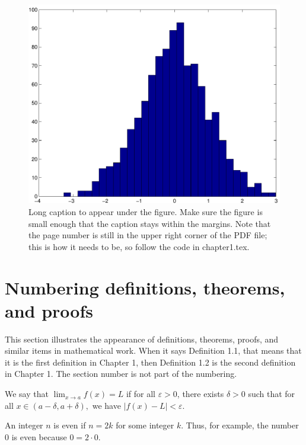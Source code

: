 \begin{landscape}
\thispagestyle{lscape}
\pagestyle{lscape}
  \begin{figure}
    \includegraphics[width=\linewidth,height=\textheight-1in]{figures/figure.pdf}
    \caption[Short caption for List of Figures]{Long caption to appear under the figure.  Make sure the figure is small enough that the caption stays within the margins.  Note that the page number is still in the upper right corner of the PDF file; this is how it needs to be, so follow the code in chapter1.tex.}
  \end{figure}
\end{landscape}

\section{Numbering definitions, theorems, and proofs}
This section illustrates the appearance of definitions, theorems, proofs, and similar items in mathematical work.
When it says Definition 1.1, that means that it is the first definition in Chapter 1, then Definition 1.2 is the second definition in Chapter 1.
The section number is not part of the numbering.

\begin{definition}
We say that $\lim_{x \to a} f(x) = L$ if for all $\varepsilon > 0$, there exists $\delta > 0$ such that for all $x \in (a-\delta,a+\delta),$ we have $|f(x) - L| < \varepsilon$.
\end{definition}

\begin{definition}
An integer $n$ is even if $n=2k$ for some integer $k$.
Thus, for example, the number $0$ is even because $0=2\cdot 0$.
\end{definition}

